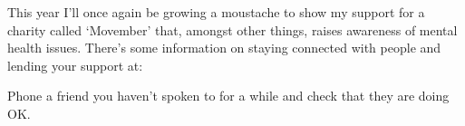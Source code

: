 
This year I'll once again be growing a moustache to show my support
for a charity called `Movember' that, amongst other things,
raises awareness of mental health issues. There's some information
on staying connected with people and lending your support at:

\begin{exercise}
Phone a friend you haven't spoken to for a while and check that they are doing OK.
\end{exercise}
